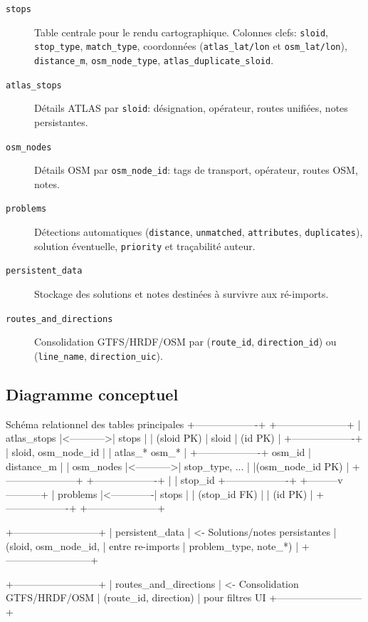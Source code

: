 \begin{description}
  \item[\texttt{stops}] Table centrale pour le rendu cartographique. Colonnes clefs: \texttt{sloid}, \texttt{stop\_type}, \texttt{match\_type}, coordonnées (\texttt{atlas\_lat/lon} et \texttt{osm\_lat/lon}), \texttt{distance\_m}, \texttt{osm\_node\_type}, \texttt{atlas\_duplicate\_sloid}.
  
  \item[\texttt{atlas\_stops}] Détails ATLAS par \texttt{sloid}: désignation, opérateur, routes unifiées, notes persistantes.
  
  \item[\texttt{osm\_nodes}] Détails OSM par \texttt{osm\_node\_id}: tags de transport, opérateur, routes OSM, notes.
  
  \item[\texttt{problems}] Détections automatiques (\texttt{distance}, \texttt{unmatched}, \texttt{attributes}, \texttt{duplicates}), solution éventuelle, \texttt{priority} et traçabilité auteur.
  
  \item[\texttt{persistent\_data}] Stockage des solutions et notes destinées à survivre aux ré-imports.
  
  \item[\texttt{routes\_and\_directions}] Consolidation GTFS/HRDF/OSM par (\texttt{route\_id}, \texttt{direction\_id}) ou (\texttt{line\_name}, \texttt{direction\_uic}).
\end{description}

\subsection*{Diagramme conceptuel}

\begin{codebox}{Schéma relationnel des tables principales}
+-------------------+             +---------------------+
|   atlas_stops     |<----------->|      stops          |
|  (sloid PK)       |    sloid    | (id PK)             |
+-------------------+             | sloid, osm_node_id  |
                                  | atlas_*  osm_*      |
+-------------------+    osm_id   | distance_m          |
|    osm_nodes      |<----------->| stop_type, ...      |
|(osm_node_id PK)   |             +---------------------+
+-------------------+                        |
                                             | stop_id
+-------------------+              +---------v-----------+
|    problems       |<-------------|      stops          |
| (stop_id FK)      |              | (id PK)             |
+-------------------+              +---------------------+

+--------------------------+
|    persistent_data       |     <- Solutions/notes persistantes
| (sloid, osm_node_id,     |        entre re-imports
|  problem_type, note_*)   |
+--------------------------+

+--------------------------+
| routes_and_directions    |     <- Consolidation GTFS/HRDF/OSM
|  (route_id, direction)   |        pour filtres UI
+--------------------------+
\end{codebox}

